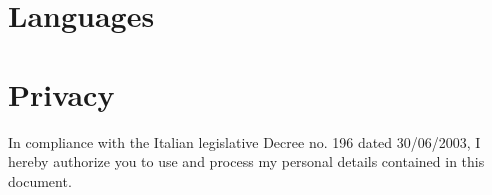 \documentclass[11pt,a4paper,sans]{moderncv} %
\begin{document}


\section{Languages}


\section{Privacy}
In compliance with the Italian legislative Decree no. 196 dated 30/06/2003, I hereby authorize you to use and process my personal details contained in this document.

\end{document}
